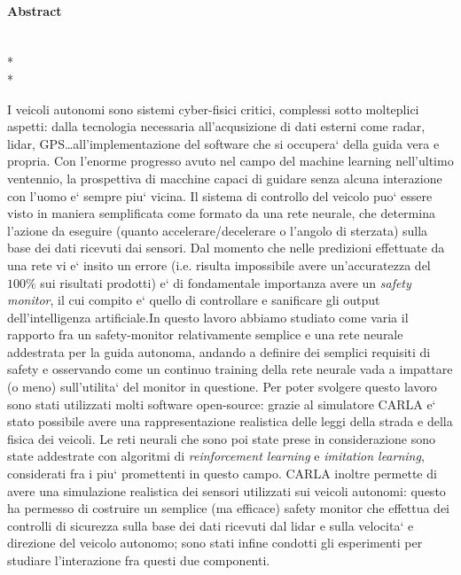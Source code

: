 \paragraph{Abstract}\mbox{}\\*\\*

I veicoli autonomi sono sistemi cyber-fisici critici, complessi sotto molteplici aspetti: dalla tecnologia necessaria all'acqusizione di dati esterni come radar, lidar, GPS\dots all'implementazione del software che si occupera` della guida vera e propria. Con l'enorme progresso avuto nel campo del machine learning nell'ultimo ventennio, la prospettiva di macchine capaci di guidare senza alcuna interazione con l'uomo e` sempre piu` vicina.\newline
Il sistema di controllo del veicolo puo` essere visto in maniera semplificata come formato da una rete neurale, che determina l'azione da eseguire (quanto accelerare/decelerare o l'angolo di sterzata) sulla base dei dati ricevuti dai sensori. Dal momento che nelle predizioni effettuate da una rete vi e` insito un errore (i.e. risulta impossibile avere un'accuratezza del $100\%$ sui risultati prodotti) e` di fondamentale importanza avere un \textsl{safety monitor}, il cui compito e` quello di controllare e sanificare gli output dell'intelligenza artificiale.\newline In questo lavoro abbiamo studiato come varia il rapporto fra un safety-monitor relativamente semplice e una rete neurale addestrata per la guida autonoma, andando a definire dei semplici requisiti di safety e osservando come un continuo training della rete neurale vada a impattare (o meno) sull'utilita` del monitor in questione.\newline
Per poter svolgere questo lavoro sono stati utilizzati molti software open-source: grazie al simulatore CARLA e` stato possibile avere una rappresentazione realistica delle leggi della strada e della fisica dei veicoli. Le reti neurali che sono poi state prese in considerazione sono state addestrate con algoritmi di \textsl{reinforcement learning} e \textsl{imitation learning}, considerati fra i piu` promettenti in questo campo. CARLA inoltre permette di avere una simulazione realistica dei sensori utilizzati sui veicoli autonomi: questo ha permesso di costruire un semplice (ma efficace) safety monitor che effettua dei controlli di sicurezza sulla base dei dati ricevuti dal lidar e sulla velocita` e direzione del veicolo autonomo; sono stati infine condotti gli esperimenti per studiare l'interazione fra questi due componenti.